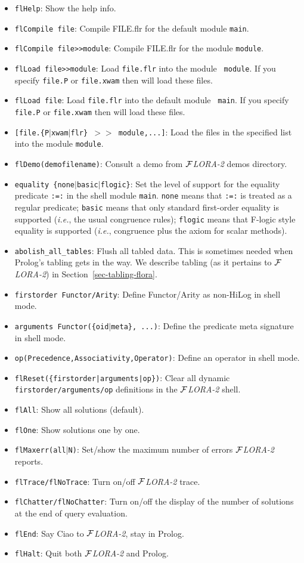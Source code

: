 \documentclass[11pt]{article}
\newcommand{\FLORA}{{\mbox{${\cal F}${\small\it LORA}\rm\emph{-2}}}\xspace}
\newcommand{\ofile}{xwam}
\begin{document}
\begin{itemize}
\item {\tt flHelp}:
    Show the help info.
\item {\tt flCompile file}:
    Compile FILE.flr for the default module {\tt main}.
\item {\tt flCompile file>>module}:
    Compile FILE.flr for the module {\tt module}.
  \item {\tt flLoad file>>module}: Load {\tt file.flr} into the module {\tt
      module}. If you specify {\tt file.P} or {\tt file.\ofile} then will load
    these files.
  \item {\tt flLoad file}: Load {\tt file.flr} into the default module {\tt
      main}. If you specify {\tt file.P} or {\tt file.\ofile} then will load
    these files.
\item {\tt [file.\{P$|$\ofile$|$flr\} $>>$ module,...]}:
    Load the files in the specified list into the module {\tt module}.
\item {\tt flDemo(demofilename)}:
    Consult a demo from \FLORA demos directory.
\item {\tt equality \{none$|$basic$|$flogic\}}:
    Set the level of support for the equality predicate {\tt :=:} in the
    shell module {\tt main}.
    {\tt none}  means that {\tt :=:} is treated as a regular
    predicate; {\tt basic} means that only standard first-order equality is
    supported ({\it i.e.}, the usual congruence rules); {\tt flogic} means
    that F-logic style equality is supported ({\it i.e.}, congruence plus
    the axiom for scalar methods).
\item {\tt abolish\_all\_tables}:
    Flush all tabled data. This is sometimes needed when Prolog's tabling 
    gets in the way. We describe tabling (as it pertains to \FLORA) in
    Section~\ref{sec-tabling-flora}.
\item {\tt firstorder Functor/Arity}:
    Define Functor/Arity as non-HiLog in shell mode.
\item {\tt arguments Functor(\{oid$|$meta\}, ...)}:
    Define the predicate meta signature in shell mode.
\item {\tt op(Precedence,Associativity,Operator)}:
    Define an operator in shell mode.
\item {\tt flReset(\{firstorder|arguments|op\})}:
    Clear all dynamic {\tt firstorder/arguments/op}  definitions in the
    \FLORA shell.
\item {\tt flAll}:
    Show all solutions (default).
\item {\tt flOne}:
    Show solutions one by one.
\item {\tt flMaxerr(all$|$N)}:
    Set/show the maximum number of errors \FLORA reports.
\item {\tt flTrace/flNoTrace}:
    Turn on/off \FLORA trace.
\item {\tt flChatter/flNoChatter}:
    Turn on/off the display of the number of solutions at the end of query
    evaluation.
\item {\tt flEnd}:
    Say Ciao to \FLORA, stay in Prolog.
\item {\tt flHalt}:
    Quit both \FLORA and Prolog.
\end{itemize}
%
\end{document}
